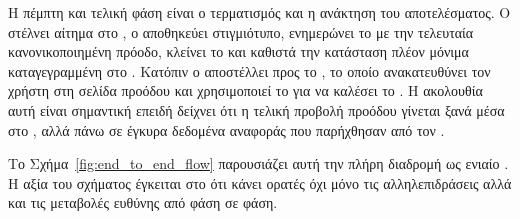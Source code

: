 Η πέμπτη και τελική φάση είναι ο τερματισμός και η ανάκτηση του αποτελέσματος. Ο  στέλνει  αίτημα στο , ο \texttt{} αποθηκεύει στιγμιότυπο, ενημερώνει το  με την τελευταία κανονικοποιημένη πρόοδο, κλείνει το  και καθιστά την κατάσταση πλέον μόνιμα καταγεγραμμένη στο . Κατόπιν ο  αποστέλλει \texttt{} προς το , το οποίο ανακατευθύνει τον χρήστη στη σελίδα προόδου και χρησιμοποιεί το  για να καλέσει το \texttt{}. Η ακολουθία αυτή είναι σημαντική επειδή δείχνει ότι η τελική προβολή προόδου γίνεται ξανά μέσα στο , αλλά πάνω σε έγκυρα δεδομένα αναφοράς που παρήχθησαν από τον .

Το Σχήμα~\ref{fig:end_to_end_flow} παρουσιάζει αυτή την πλήρη διαδρομή ως ενιαίο . Η αξία του σχήματος έγκειται στο ότι κάνει ορατές όχι μόνο τις αλληλεπιδράσεις αλλά και τις μεταβολές ευθύνης από φάση σε φάση.


